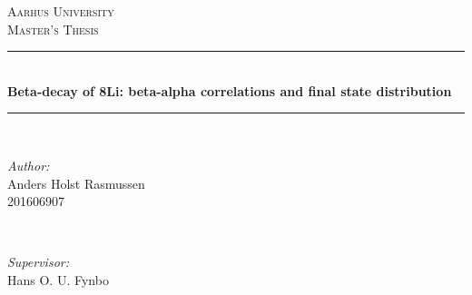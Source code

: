 \documentclass[12pt]{article}
\begin{document}
\begin{titlepage}

\newcommand{\HRule}{\rule{\linewidth}{0.5mm}} %

\center %
 

\textsc{\LARGE Aarhus University}\\[1.5cm] %
\textsc{\Large Master's Thesis}\\[0.5cm] %



\HRule \\[0.4cm]
{ \Large \bfseries Beta-decay of 8Li: beta-alpha correlations and final state distribution}\\[0.4cm] %
\HRule \\[1.5cm]
 

\begin{minipage}{0.4\textwidth}
\begin{flushleft} \large
\emph{Author:}\\
Anders Holst Rasmussen\\
201606907
\end{flushleft}
\end{minipage}
~
\begin{minipage}{0.4\textwidth}
\begin{flushright} \large
\emph{Supervisor:} \\
Hans O. U. Fynbo %
\end{flushright}
\end{minipage}\\[2cm]



\end{titlepage}
\end{document}
